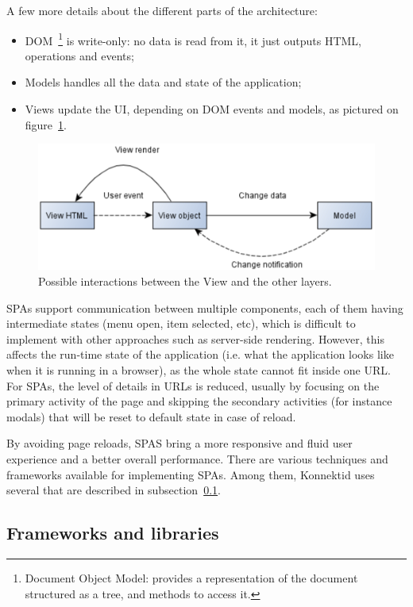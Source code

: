 A few more details about the different parts of the architecture:
\begin{itemize}[noitemsep]
    \item DOM~\footnote{Document Object Model: provides a representation of the document structured as a tree, and methods to access it.} is write-only:
    no data is read from it, it just outputs HTML, operations and events;
    \item Models handles all the data and state of the application;
    \item Views update the UI, depending on DOM events and models, as pictured on {\sc figure}~\ref{fig:view}.
\end{itemize}

\begin{figure}[H]
    \centering
    \includegraphics[scale=0.6]{figure/view.png}
    \caption{Possible interactions between the View and the other layers.}
    \label{fig:view}
\end{figure}

SPAs support communication between multiple components, each of them having intermediate states (menu open, item selected, etc), which is difficult to
implement with other approaches such as server-side rendering. However, this affects the run-time state of the application (i.e. what the application looks like when it is
running in a browser), as the whole state cannot fit inside one URL. For SPAs, the level of details in URLs is reduced, usually by focusing on the primary activity
of the page and skipping the secondary activities (for instance modals) that will be reset to default state in case of reload.

By avoiding page reloads, SPAS bring a more responsive and fluid user experience and a better overall performance.
There are various techniques and frameworks available for implementing SPAs.
Among them, Konnektid uses several that are described in {\sc subsection}~\ref{ssec:frameworks}.

\subsection{Frameworks and libraries}
\label{ssec:frameworks}


